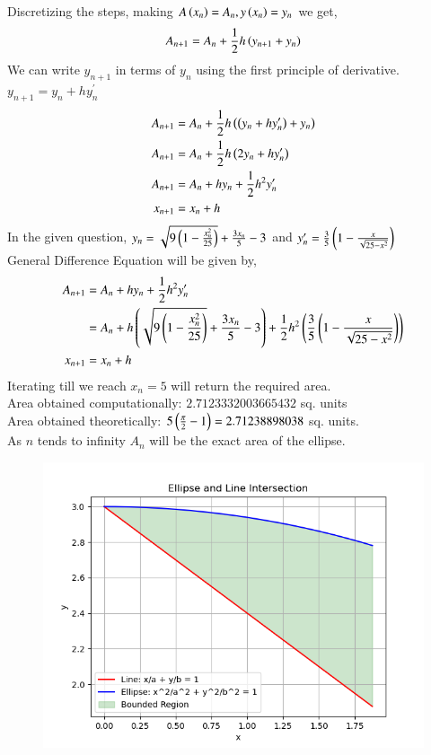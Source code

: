 \documentclass[journal]{IEEEtran}
\begin{document}
Discretizing the steps, making $A\left(x_n\right)=A_n, y\left(x_n\right)=y_n$ we get,
\begin{align}
 A_{n+1}=A_n+\frac{1}{2}h\left(y_{n+1}+y_n\right)
\end{align}
We can write $y_{n+1}$ in terms of $y_n$ using the first principle of derivative. $y_{n+1}=y_n+hy^{\prime}_n$
\begin{align}
  A_{n+1}&=A_n+\frac{1}{2}h\left(\left(y_{n}+hy^{\prime}_n\right)+y_n\right)\\
  A_{n+1}&=A_n+\frac{1}{2}h\left(2y_n+hy^{\prime}_n\right)\\
  A_{n+1}&=A_n+hy_n+\frac{1}{2}h^2y^{\prime}_n\\
  x_{n+1}&=x_n+h
\end{align}
In the given question, $y_n=\sqrt{9\left(1-\frac{x_n^2}{25}\right)}+\frac{3x_n}{5}-3$ and $y^{\prime}_n=\frac{3}{5}\left(1-\frac{x}{\sqrt{25-x^2}}\right)$\\
General Difference Equation will be given by,
\begin{align}
  A_{n+1}&=A_n+hy_n+\frac{1}{2}h^2y^{\prime}_n\\
  &=A_n+h\left(\sqrt{9\left(1-\frac{x_n^2}{25}\right)}+\frac{3x_n}{5}-3\right)+\frac{1}{2}h^2\left(\frac{3}{5}\left(1-\frac{x}{\sqrt{25-x^2}}\right)\right)\\
  x_{n+1}&=x_n+h
\end{align}
Iterating till we reach $x_n=5$ will return the required area.\\
Area obtained computationally: $2.7123332003665432$ sq. units\\
Area obtained theoretically: $5\left(\frac{\pi}{2}-1\right)=2.71238898038$ sq. units.\\
As $n$ tends to infinity $A_n$ will be the exact area of the ellipse.
\begin{figure}[h!]
   \centering
   \includegraphics[width=1\linewidth]{figs/fig.png}
   
   \label{stemplot}
\end{figure}
\end{document}

